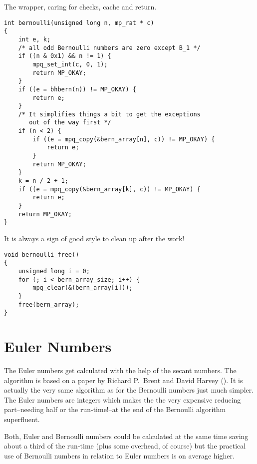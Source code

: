 \documentclass[10pt]{book}
\theoremstyle{definition}
\theoremstyle{remark}
\begin{document}
The wrapper, caring for checks, cache and return.
 \begin{center}
    \begin{lstlisting}[caption={Bernoulli Wrapper},label=bernratwrap]
int bernoulli(unsigned long n, mp_rat * c)
{
    int e, k;
    /* all odd Bernoulli numbers are zero except B_1 */
    if ((n & 0x1) && n != 1) {
        mpq_set_int(c, 0, 1);
        return MP_OKAY;
    }
    if ((e = bhbern(n)) != MP_OKAY) {
        return e;
    }
    /* It simplifies things a bit to get the exceptions 
       out of the way first */
    if (n < 2) {
        if ((e = mpq_copy(&bern_array[n], c)) != MP_OKAY) {
            return e;
        }
        return MP_OKAY;
    }
    k = n / 2 + 1;
    if ((e = mpq_copy(&bern_array[k], c)) != MP_OKAY) {
        return e;
    }
    return MP_OKAY;
}
    \end{lstlisting}
  \end{center}
It is always a sign of good style to clean up after the work!
 \begin{center}
    \begin{lstlisting}[caption={Free Bernoulli Array},label=freebernarray]
void bernoulli_free()
{
    unsigned long i = 0;
    for (; i < bern_array_size; i++) {
        mpq_clear(&(bern_array[i]));
    }
    free(bern_array);
}
    \end{lstlisting}
  \end{center}
\section{Euler Numbers}
The Euler numbers get calculated with the help of the secant numbers. The
algorithm is based on a paper by Richard P.~Brent and David Harvey
(\cite{2011arXiv1108.0286B}). It is actually the very same algorithm as for
the Bernoulli numbers just much simpler. The Euler numbers are integers which
makes the the very expensive reducing part--needing half or the run-time!--at
the end of the Bernoulli algorithm superfluent.

Both, Euler and Bernoulli numbers could be calculated at the same time saving
about a third of the run-time (plus some overhead, of course) but the practical
use of Bernoulli numbers in relation to Euler numbers is on average higher.
\end{document}
